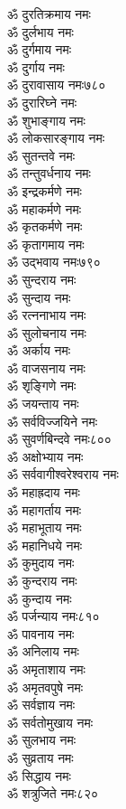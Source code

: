 \begin{center}
\begin{multicols}{2}
\begin{flushleft}
ॐ दुरतिक्रमाय नमः\\
ॐ दुर्लभाय नमः\\
ॐ दुर्गमाय नमः\\
ॐ दुर्गाय नमः\\
ॐ दुरावासाय नमः\hfill ७८०\\
ॐ दुरारिघ्ने नमः\\
ॐ शुभाङ्गाय नमः\\
ॐ लोकसारङ्गाय नमः\\
ॐ सुतन्तवे नमः\\
ॐ तन्तुवर्धनाय नमः\\
ॐ इन्द्रकर्मणे नमः\\
ॐ महाकर्मणे नमः\\
ॐ कृतकर्मणे नमः\\
ॐ कृतागमाय नमः\\
ॐ उद्भवाय नमः\hfill ७९०\\
ॐ सुन्दराय नमः\\
ॐ सुन्दाय नमः\\
ॐ रत्ननाभाय नमः\\
ॐ सुलोचनाय नमः\\
ॐ अर्काय नमः\\
ॐ वाजसनाय नमः\\
ॐ शृङ्गिणे नमः\\
ॐ जयन्ताय नमः\\
ॐ सर्वविज्जयिने नमः\\
ॐ सुवर्णबिन्दवे नमः\hfill ८००\\
ॐ अक्षोभ्याय नमः\\
ॐ सर्ववागीश्वरेश्वराय नमः\\
ॐ महाह्रदाय नमः\\
ॐ महागर्ताय नमः\\
ॐ महाभूताय नमः\\
ॐ महानिधये नमः\\
ॐ कुमुदाय नमः\\
ॐ कुन्दराय नमः\\
ॐ कुन्दाय नमः\\
ॐ पर्जन्याय नमः\hfill ८१०\\
ॐ पावनाय नमः\\
ॐ अनिलाय नमः\\
ॐ अमृताशाय नमः\\
ॐ अमृतवपुषे नमः\\
ॐ सर्वज्ञाय नमः\\
ॐ सर्वतोमुखाय नमः\\
ॐ सुलभाय नमः\\
ॐ सुव्रताय नमः\\
ॐ सिद्धाय नमः\\
ॐ शत्रुजिते नमः\hfill ८२०\\

\end{flushleft}
\end{multicols}
\end{center}
